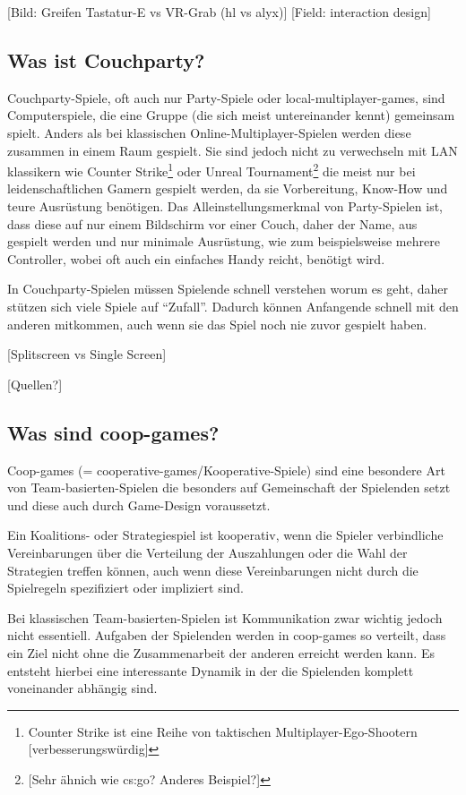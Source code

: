 [Bild: Greifen Tastatur-E vs VR-Grab (hl vs alyx)]
[Field: interaction design]

\subsection{Was ist Couchparty?\label{_party_games}}


Couchparty-Spiele, oft auch nur Party-Spiele oder local-multiplayer-games, sind Computerspiele, die eine Gruppe (die sich meist untereinander kennt) gemeinsam spielt. Anders als bei klassischen Online-Multiplayer-Spielen werden diese zusammen in einem Raum gespielt. Sie sind jedoch nicht zu verwechseln mit LAN klassikern wie Counter Strike\footnote{Counter Strike ist eine Reihe von taktischen Multiplayer-Ego-Shootern [verbesserungswürdig]} oder Unreal Tournament\footnote{[Sehr ähnich wie cs:go? Anderes Beispiel?]} die meist nur bei leidenschaftlichen Gamern gespielt werden, da sie Vorbereitung, Know-How und teure Ausrüstung benötigen. Das Alleinstellungsmerkmal von Party-Spielen ist, dass diese auf nur einem Bildschirm vor einer Couch, daher der Name, aus gespielt werden und nur minimale Ausrüstung, wie zum beispielsweise mehrere Controller, wobei oft auch ein einfaches Handy reicht, benötigt wird.

In Couchparty-Spielen müssen Spielende schnell verstehen worum es geht, daher stützen sich viele Spiele auf "`Zufall"'. Dadurch können Anfangende schnell mit den anderen mitkommen, auch wenn sie das Spiel noch nie zuvor gespielt haben.

[Splitscreen vs Single Screen]

[Quellen?]

\subsection{Was sind coop-games?}

Coop-games (= cooperative-games/Kooperative-Spiele) sind eine besondere Art von Team-basierten-Spielen die besonders auf Gemeinschaft der Spielenden setzt und diese auch durch Game-Design voraussetzt. 

Ein Koalitions- oder Strategiespiel ist kooperativ, wenn die Spieler verbindliche Vereinbarungen über die Verteilung der Auszahlungen oder die Wahl der Strategien treffen können, auch wenn diese Vereinbarungen nicht durch die Spielregeln spezifiziert oder impliziert sind.\cite{_introduction_to_the_theory_of_cooperative_games}

Bei klassischen Team-basierten-Spielen ist Kommunikation zwar wichtig jedoch nicht essentiell. Aufgaben der Spielenden werden in coop-games so verteilt, dass ein Ziel nicht ohne die Zusammenarbeit der anderen erreicht werden kann. Es entsteht hierbei eine interessante Dynamik in der die Spielenden komplett voneinander abhängig sind. 


